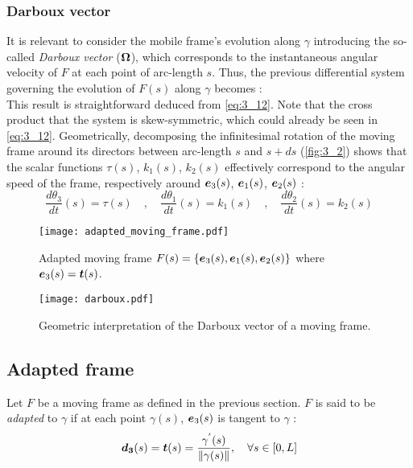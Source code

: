 \subsubsection{Darboux vector}
It is relevant to consider the mobile frame's evolution along $\gamma$ introducing the so-called \emph{Darboux vector} ($\boldsymbol{\Omega}$), which corresponds to the instantaneous angular velocity of $F$ at each point of arc-length $s$. Thus, the previous differential system governing the evolution of $F(s)$ along $\gamma$ becomes :
\begin{equation}
	
\end{equation}
This result is straightforward deduced from \eqref{eq:3_12}. Note that the cross product  that the system is skew-symmetric, which could already be seen in \eqref{eq:3_12}.
Geometrically, decomposing the infinitesimal rotation of the moving frame around its directors between arc-length $s$ and $s+ds$ (\autoref{fig:3_2}) shows that the scalar functions $\tau(s)$, $k_{1}(s)$, $k_{2}(s)$ effectively correspond to the angular speed of the frame, respectively around $\boldsymbol{e}_{3}(s)$, $\boldsymbol{e}_{1}(s)$, $\boldsymbol{e}_{2}(s)$ :
\begin{equation}
	\frac{d\theta_3}{dt}(s) = \tau(s)
	\quad,\quad
	\frac{d\theta_1}{dt}(s) = k_{1}(s)
	\quad,\quad
	\frac{d\theta_2}{dt}(s) = k_{2}(s)
\end{equation}

\begin{figure}[t]
\begin{center}
\texttt{[image: adapted\_moving\_frame.pdf]}
\caption{Adapted moving frame $F(s) =\{\boldsymbol{e}_{3}(s),\boldsymbol{e}_{1}(s),\boldsymbol{e}_{2}(s)\}$ where $\boldsymbol{e}_3(s) = \boldsymbol{t}(s)$.}
\label{fig:3_1}
\end{center}
\end{figure}

\begin{figure}[t]
\begin{center}
\texttt{[image: darboux.pdf]}
\caption{Geometric interpretation of the Darboux vector of a moving frame.}
\label{fig:3_2}
\end{center}
\end{figure}

\subsection{Adapted frame}
Let $F$ be a moving frame as defined in the previous section. $F$ is said to be \emph{adapted} to $\gamma$ if at each point $\gamma(s)$, $\boldsymbol{e}_{3}(s)$ is tangent to $\gamma$ :
\begin{equation}
	\boldsymbol{d_{3}}(s) = \boldsymbol{t}(s) = \frac{\gamma^{'}(s)}{\|\gamma(s)\|}, \quad \forall s \in [0,L]
\end{equation}


